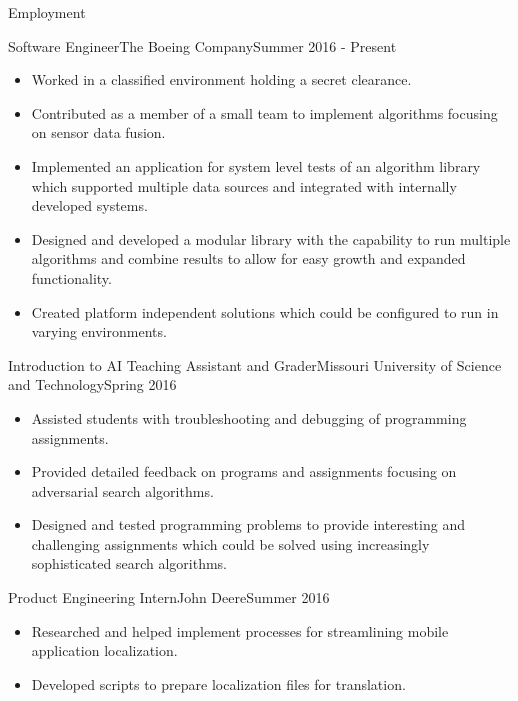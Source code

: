 \documentclass[]{mcdowellcv}
\begin{document}
\makeheader

\begin{cvsection}{Employment}

\begin{boeing}
    \begin{cvsubsection}{Software Engineer}{The Boeing Company}{Summer 2016 - Present}         
        \begin{itemize}
            \item Worked in a classified environment holding a secret clearance.
            \item Contributed as a member of a small team to implement algorithms focusing on sensor data fusion.
            \item Implemented an application for system level tests of an algorithm library which supported multiple data sources and integrated with internally developed systems. 
            \item Designed and developed a modular library with the capability to run multiple algorithms and combine results to allow for easy growth and expanded functionality.
            \item Created platform independent solutions which could be configured to run in varying environments.
        \end{itemize}
    \end{cvsubsection}
\end{boeing}
    
\begin{aigrader}
    \begin{cvsubsection}[2]{Introduction to AI Teaching Assistant and Grader}{Missouri University of Science and Technology}{Spring 2016}
        \begin{itemize}
            \item Assisted students with troubleshooting and debugging of programming assignments.
            \item Provided detailed feedback on programs and assignments focusing on adversarial search algorithms.
            \item Designed and tested programming problems to provide interesting and challenging assignments which could be solved using increasingly sophisticated search algorithms.
        \end{itemize}
    \end{cvsubsection}
\end{aigrader}

\begin{johndeere}
    \begin{cvsubsection}{Product Engineering Intern}{John Deere}{Summer 2016}
        \begin{itemize}
            \item Researched and helped implement processes for streamlining mobile application localization.
            \item Developed scripts to prepare localization files for translation.
        \end{itemize}
    \end{cvsubsection}
\end{johndeere}
    

\end{cvsection}
\end{document}
